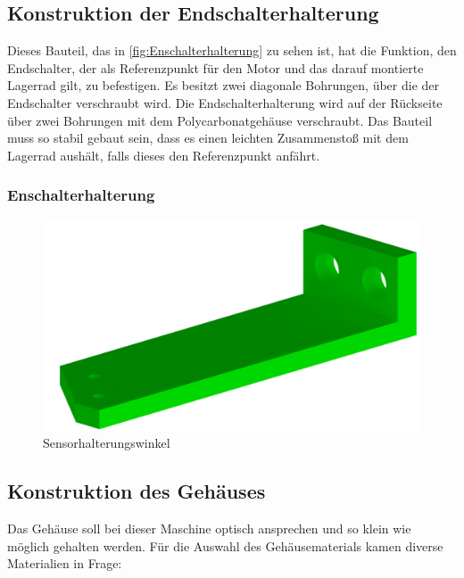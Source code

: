 \subsection{Konstruktion der Endschalterhalterung}
Dieses Bauteil, das in \autoref{fig:Enschalterhalterung} zu sehen ist, hat die Funktion, den Endschalter, der als Referenzpunkt für den Motor und das darauf montierte
Lagerrad gilt, zu befestigen.
Es besitzt zwei diagonale Bohrungen, über die der Endschalter verschraubt wird.
Die Endschalterhalterung wird auf der Rückseite über zwei Bohrungen mit dem Polycarbonatgehäuse verschraubt.
Das Bauteil muss so stabil gebaut sein, dass es einen leichten Zusammenstoß mit dem Lagerrad aushält, falls dieses
den Referenzpunkt anfährt.

\subsubsection{Enschalterhalterung}
\begin{figure}[H]
    \centering
    \includegraphics[width=8 cm]{fig/mech/AufhaengungEndschalter.png}
    \caption{Sensorhalterungswinkel}
    \label{fig:Enschalterhalterung}
\end{figure}

\subsection{Konstruktion des Gehäuses}
Das Gehäuse soll bei dieser Maschine optisch ansprechen und so klein wie möglich gehalten werden.
Für die Auswahl des Gehäusematerials kamen diverse Materialien in Frage:

